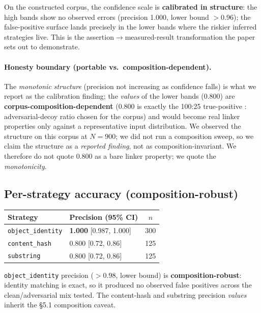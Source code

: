 \documentclass[11pt]{article}
\newcommand{\dto}{\ensuremath{\rightarrow}}     %
\begin{document}
On the constructed corpus, the confidence scale is \textbf{calibrated in structure}: the high bands show no
observed errors (precision 1.000, lower bound $>0.96$); the false-positive surface lands precisely in the
lower bands where the riskier inferred strategies live. This is the assertion\dto{}measured-result
transformation the paper sets out to demonstrate.

\paragraph{Honesty boundary (portable vs.\ composition-dependent).} The \emph{monotonic structure} (precision not increasing as confidence falls) is what we report as the calibration finding; the
\emph{values} of the lower bands (0.800) are \textbf{corpus-composition-dependent} (0.800 is exactly the
100:25 true-positive : adversarial-decoy ratio chosen for the corpus) and would become real linker
properties only against a representative input distribution. We observed the structure on this corpus at
$N=900$; we did not run a composition sweep, so we claim the structure as a \emph{reported finding}, not as
composition-invariant. We therefore do not quote 0.800 as a bare linker property; we quote the
\emph{monotonicity}.

\subsection{Per-strategy accuracy (composition-robust)}

\begin{table}[h]
\centering
\small
\begin{tabular}{@{}llc@{}}
\toprule
Strategy & Precision (95\% CI) & $n$ \\
\midrule
\texttt{object\_identity} & \textbf{1.000} [0.987, 1.000] & 300 \\
\texttt{content\_hash} & 0.800 [0.72, 0.86] & 125 \\
\texttt{substring} & 0.800 [0.72, 0.86] & 125 \\
\bottomrule
\end{tabular}
\end{table}

\texttt{object\_identity} precision ($>0.98$, lower bound) is \textbf{composition-robust}: identity matching
is exact, so it produced no observed false positives across the clean/adversarial mix tested. The
content-hash and substring precision \emph{values} inherit the \S5.1 composition caveat.
\end{document}
